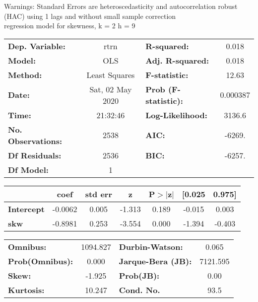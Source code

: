 Warnings: \newline
 [1] Standard Errors are heteroscedasticity and autocorrelation robust (HAC) using 1 lags and without small sample correction\\ 

regression model for skewness, k = 2 h = 9\begin{center}
\begin{tabular}{lclc}
\toprule
\textbf{Dep. Variable:}    &       rtrn       & \textbf{  R-squared:         } &     0.018   \\
\textbf{Model:}            &       OLS        & \textbf{  Adj. R-squared:    } &     0.018   \\
\textbf{Method:}           &  Least Squares   & \textbf{  F-statistic:       } &     12.63   \\
\textbf{Date:}             & Sat, 02 May 2020 & \textbf{  Prob (F-statistic):} &  0.000387   \\
\textbf{Time:}             &     21:32:46     & \textbf{  Log-Likelihood:    } &    3136.6   \\
\textbf{No. Observations:} &        2538      & \textbf{  AIC:               } &    -6269.   \\
\textbf{Df Residuals:}     &        2536      & \textbf{  BIC:               } &    -6257.   \\
\textbf{Df Model:}         &           1      & \textbf{                     } &             \\
\bottomrule
\end{tabular}
\begin{tabular}{lcccccc}
                   & \textbf{coef} & \textbf{std err} & \textbf{z} & \textbf{P$> |$z$|$} & \textbf{[0.025} & \textbf{0.975]}  \\
\midrule
\textbf{Intercept} &      -0.0062  &        0.005     &    -1.313  &         0.189        &       -0.015    &        0.003     \\
\textbf{skw}       &      -0.8981  &        0.253     &    -3.554  &         0.000        &       -1.394    &       -0.403     \\
\bottomrule
\end{tabular}
\begin{tabular}{lclc}
\textbf{Omnibus:}       & 1094.827 & \textbf{  Durbin-Watson:     } &    0.065  \\
\textbf{Prob(Omnibus):} &   0.000  & \textbf{  Jarque-Bera (JB):  } & 7121.595  \\
\textbf{Skew:}          &  -1.925  & \textbf{  Prob(JB):          } &     0.00  \\
\textbf{Kurtosis:}      &  10.247  & \textbf{  Cond. No.          } &     93.5  \\
\bottomrule
\end{tabular}
\end{center}

